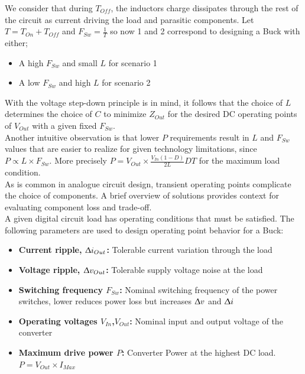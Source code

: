 \documentclass[letterpaper,twocolumn,10pt]{article}
\begin{document}
We consider that during $T_{Off}$, the inductors charge dissipates through the rest of the circuit as current driving the load and parasitic components. Let $T = T_{On}+T_{Off}$ and $F_{Sw} = \frac{1}{T}$ so now 1 and 2 correspond to designing a Buck with either;\\
\begin{itemize} %
\item{A high $F_{Sw}$ and small $L$ for scenario 1}
\item{A low $F_{Sw}$ and high $L$ for scenario 2}
\end{itemize}
With the voltage step-down principle is in mind, it follows that the choice of $L$ determines the choice of $C$ to minimize $Z_{Out}$ for the desired DC operating points of $V_{Out}$ with a given fixed $F_{Sw}$.\\
Another intuitive observation is that lower $P$ requirements result in $L$ and $F_{Sw}$ values that are easier to realize for given technology limitations, since $P \propto L\times F_{Sw}$. More precisely $P = V_{Out}\times \frac{V_{In}(1 - D)}{2L}DT$ for the maximum load condition.\\ %
\indent As is common in analogue circuit design, transient operating points complicate the choice of components. A brief overview of solutions provides context for evaluating component loss and trade-off.\\ 
A given digital circuit load has operating conditions that must be satisfied. The following parameters are used to design operating point behavior for a Buck:
\begin{itemize}
\item {\textbf{Current ripple, $\Updelta i_{Out}$: }Tolerable current variation through the load}
\item {\textbf{Voltage ripple, $\Updelta v_{Out}$: }Tolerable supply voltage noise at the load}
\item {\textbf{Switching frequency $F_{Sw}$: }Nominal switching frequency of the power switches, lower reduces power loss but increases $\Updelta v$ and $\Updelta i$}
\item {\textbf{Operating voltages $V_{In}$,$V_{Out}$: }Nominal input and output voltage of the converter}
\item {\textbf{Maximum drive power $P$: }Converter Power at the highest DC load. $P = V_{Out}\times I_{Max}$} 
\end{itemize}   
\end{document}
